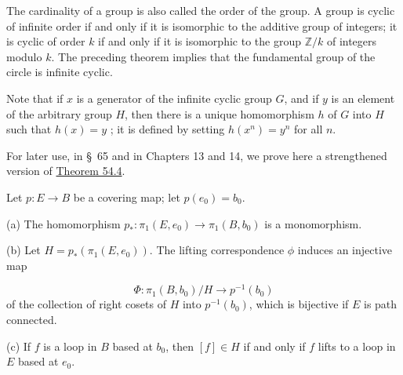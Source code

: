The cardinality of a group is also called the order of the group. A group is cyclic of infinite order if and only if it is isomorphic to the additive group of integers; it is cyclic of order \(k\) if and only if it is isomorphic to the group \(\mathbb{Z}/k\) of integers modulo \(k\). The preceding theorem implies that the fundamental group of the circle is infinite cyclic.

Note that if \(x\) is a generator of the infinite cyclic group \(G\), and if \(y\) is an element of the arbitrary group \(H\), then there is a unique homomorphism \(h\) of \(G\) into \(H\) such that \(h(x) = y\) ; it is defined by setting \(h( x^{n}) = y^{n}\) for all \(n\).

For later use, in \S\ 65 and in Chapters 13 and 14, we prove here a strengthened version of \hyperref[thm:54.4]{Theorem 54.4}.

\begin{theorem}
\label{thm:\thetheorem}
Let \(p : E \rightarrow B\) be a covering map; let \(p( e_{0}) = b_{0}\).

(a) The homomorphism \(p_{ * } : {\pi }_{1}( {E,e_{0}}) \rightarrow {\pi }_{1}( {B,b_{0}})\) is a monomorphism.

(b) Let \(H = p_{ * }( {{\pi }_{1}( {E,e_{0}}) })\). The lifting correspondence \(\phi\) induces an injective map

\[
\Phi : {\pi }_{1}( {B,b_{0}}) /H \rightarrow {p}^{-1}( b_{0})
\]
of the collection of right cosets of \(H\) into \(p^{-1}( b_{0})\), which is bijective if \(E\) is path connected.

(c) If \(f\) is a loop in \(B\) based at \(b_{0}\), then \([ f] \in H\) if and only if \(f\) lifts to a loop in \(E\) based at \(e_{0}\).
\end{theorem}

